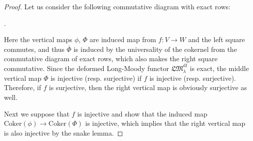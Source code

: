 \documentclass[a4paper,12pt]{article}
\theoremstyle{definition}
\theoremstyle{remark}
\begin{document}
\begin{proof}
Let us consider the following commutative diagram with exact rows:
\small
\begin{center}
	.
\end{center}
\normalsize
Here the vertical maps $\phi$, $\Phi$ 
are induced map from $f\colon V\to W$
and the left square commutes, 
and thus $\overline{\Phi}$
is induced by the universality of the cokernel from the commutative diagram of exact rows, which also makes the right square commutative.
Since the deformed Long-Moody functor $\mathfrak{LM}^{\mathrm{df}}_{\lambda}$ is exact, the middle vertical map $\Phi$ is injective (resp. surjective) if $f$ is injective (resp. surjective).
Therefore, if $f$ is surjective, then the right vertical map is obviously surjective as well.

Next we suppose that $f$ is injective and show that 
the induced map 
$\mathrm{Coker}(\phi)\rightarrow \mathrm{Coker}(\Phi)$
is injective, which implies that the right vertical map is also injective by the snake lemma.


\end{proof}
\end{document}
